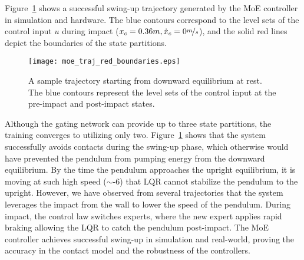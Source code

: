 Figure~\ref{fig:cartpole_trajectory} shows a successful swing-up trajectory
generated by the MoE controller in simulation and hardware.
%
The blue contours correspond to the level sets of the control input $u$ during
impact ($x_c=0.36m, \dot{x}_c = 0\nicefrac{m}{s}$), and the solid red lines
depict the boundaries of the state partitions.
%
\begin{figure}[H]
    \centering
    \texttt{[image: moe\_traj\_red\_boundaries.eps]}
    \caption{A sample trajectory starting from
    downward equilibrium at rest. The blue contours represent the level sets of
    the control input at the pre-impact and post-impact states.}
    \label{fig:cartpole_trajectory}
\end{figure}
%
\noindent Although the gating network can provide up to three state partitions,
the training converges to utilizing only two.
%
Figure~\ref{fig:cartpole_trajectory} shows that the system successfully avoids
contacts during the swing-up phase, which otherwise would have prevented the
pendulum from pumping energy from the downward equilibrium.
%
By the time the pendulum approaches the upright equilibrium, it is moving at
such high speed ($\sim$-6) that LQR cannot stabilize the
pendulum to the upright.
%
However, we have observed from several trajectories that the system leverages
the impact from the wall to lower the speed of the pendulum.
%
During impact, the control law switches experts, where the new expert applies
rapid braking allowing the LQR to catch the pendulum post-impact.
%
The MoE controller achieves successful swing-up in simulation and real-world,
proving the accuracy in the contact model and the robustness of the
controllers.

